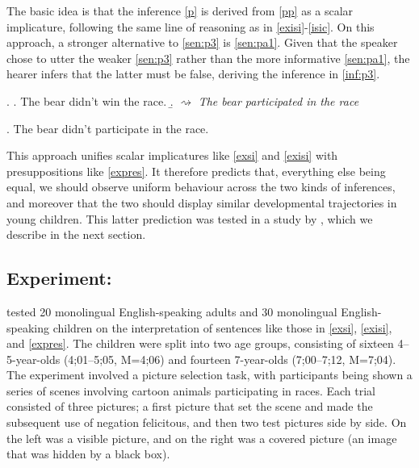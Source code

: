 \documentclass[12pt, letterpaper]{article}
\begin{document}
The basic idea is that the inference \ref{p} is derived from \ref{pp} as a scalar implicature, following the same line of reasoning as in \ref{exisi}-\ref{isic}. On this approach, a stronger alternative to \ref{sen:p3} is \ref{sen:pa1}. Given that the speaker chose to utter the weaker \ref{sen:p3} rather than the more informative \ref{sen:pa1}, the hearer infers that the latter must be false, deriving the inference in \ref{inf:p3}.

\ex.\label{expres} \a. \label{sen:p3} The bear didn't win the race. 
\b.\label{inf:p3} $\rightsquigarrow$ \textit{The bear participated in the race} 

\ex. \label{sen:pa1} The bear didn't participate in the race. 

This approach unifies scalar implicatures like \ref{exsi} and \ref{exisi} with presuppositions like \ref{expres}. It therefore predicts that, everything else being equal, we should observe uniform behaviour across the two kinds of inferences, and moreover that the two should display similar developmental trajectories in young children. This latter prediction was tested in a study by \cite{Bill:2014b}, which we describe in the next section. 

\subsection{Experiment: \cite*{Bill:2014b}}\label{sec:experiment}

\cite*{Bill:2014b} tested 20 monolingual English-speaking adults and 30 monolingual English-speaking children on the interpretation of sentences like those in \ref{exsi}, \ref{exisi}, and \ref{expres}. The children were split into two age groups, consisting of sixteen 4--5-year-olds (4;01--5;05, M=4;06) and fourteen 7-year-olds (7;00--7;12, M=7;04). The experiment involved a picture selection task, with participants being shown a series of scenes involving cartoon animals participating in races. Each trial consisted of three pictures; a first picture that set the scene and made the subsequent use of negation felicitous, and then two test pictures side by side. On the left was a visible picture, and on the right was a covered picture (an image that was hidden by a black box).
\end{document}
